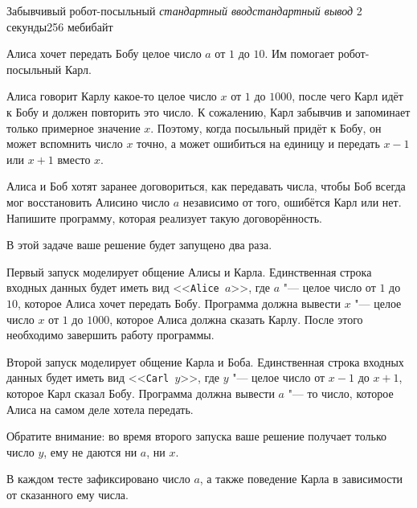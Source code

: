 \gdef\thisproblemorigin{180429p, пробный тур}
\gdef\thisproblemauthor{Иван Казменко}
\gdef\thisproblemdeveloper{Иван Казменко}
\begin{problem}{Забывчивый робот-посыльный}
{\textsl{стандартный ввод}}{\textsl{стандартный вывод}}
{2 секунды}{256 мебибайт}{}

Алиса хочет передать Бобу целое число $a$ от $1$ до $10$.
Им помогает робот-посыльный Карл.

Алиса говорит Карлу какое-то целое число $x$ от $1$ до $1000$,
после чего Карл идёт к Бобу и должен повторить это число.
К сожалению, Карл забывчив и запоминает только примерное значение $x$.
Поэтому, когда посыльный придёт к Бобу, он может вспомнить число $x$ точно,
а может ошибиться на единицу и передать $x - 1$ или $x + 1$ вместо $x$.

Алиса и Боб хотят заранее договориться, как передавать числа,
чтобы Боб всегда мог восстановить Алисино число $a$
независимо от того, ошибётся Карл или нет.
Напишите программу, которая реализует такую договорённость.

\Interaction

В этой задаче ваше решение будет запущено два раза.

Первый запуск моделирует общение Алисы и Карла.
Единственная строка входных данных будет иметь вид
<<\texttt{Alice~$a$}>>, где $a$ "--- целое число от $1$ до $10$,
которое Алиса хочет передать Бобу.
Программа должна вывести $x$ "--- целое число $x$ от $1$ до $1000$,
которое Алиса должна сказать Карлу.
После этого необходимо завершить работу программы.

Второй запуск моделирует общение Карла и Боба.
Единственная строка входных данных будет иметь вид
<<\texttt{Carl~$y$}>>, где $y$ "--- целое число от $x - 1$ до $x + 1$,
которое Карл сказал Бобу.
Программа должна вывести $a$ "--- то число, которое Алиса
на самом деле хотела передать.

Обратите внимание: во время второго запуска ваше решение
получает только число $y$, ему не даются ни $a$, ни $x$.

В каждом тесте зафиксировано число $a$,
а также поведение Карла в зависимости от сказанного ему числа.

\Examples

\begin{example}
%
%
%
%
\end{example}


\end{problem}
